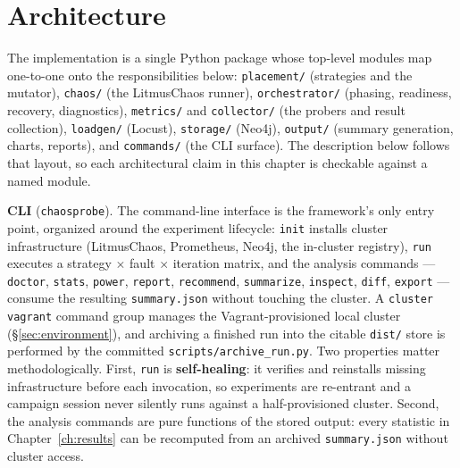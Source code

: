 \section{Architecture}\label{sec:architecture}

The implementation is a single Python package whose top-level modules map
one-to-one onto the responsibilities below: \texttt{placement/} (strategies and
the mutator), \texttt{chaos/} (the LitmusChaos runner), \texttt{orchestrator/} (phasing,
readiness, recovery, diagnostics), \texttt{metrics/} and \texttt{collector/} (the probers
and result collection), \texttt{loadgen/} (Locust), \texttt{storage/} (Neo4j),
\texttt{output/} (summary generation, charts, reports), and \texttt{commands/} (the CLI
surface). The description below follows that layout, so each architectural
claim in this chapter is checkable against a named module.

\textbf{CLI} (\texttt{chaosprobe}). The command-line interface is the framework's only
entry point, organized around the experiment lifecycle: \texttt{init} installs
cluster infrastructure (LitmusChaos, Prometheus, Neo4j, the in-cluster
registry), \texttt{run} executes a strategy $\times$ fault $\times$ iteration matrix, and the
analysis commands --- \texttt{doctor}, \texttt{stats}, \texttt{power}, \texttt{report}, \texttt{recommend},
\texttt{summarize}, \texttt{inspect}, \texttt{diff}, \texttt{export} --- consume the resulting
\texttt{summary.json} without touching the cluster. A \texttt{cluster vagrant} command
group manages the Vagrant-provisioned local cluster (\S\ref{sec:environment}), and archiving a finished
run into the citable \texttt{dist/} store is performed by the committed
\texttt{scripts/archive\_run.py}. Two properties matter methodologically. First,
\texttt{run} is \textbf{self-healing}: it verifies and reinstalls missing infrastructure
before each invocation, so experiments are re-entrant and a campaign session
never silently runs against a half-provisioned cluster. Second, the analysis
commands are pure functions of the stored output: every statistic in Chapter~\ref{ch:results} can be recomputed from an archived \texttt{summary.json} without cluster access.

